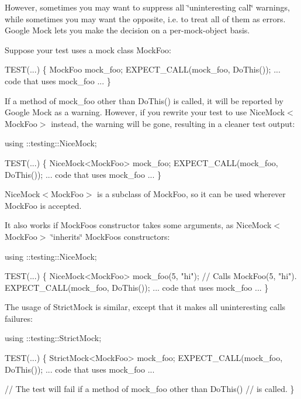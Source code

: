 However, sometimes you may want to suppress all \char`\"{}uninteresting call\char`\"{} warnings, while sometimes you may want the opposite, i.\+e. to treat all of them as errors. Google Mock lets you make the decision on a per-\/mock-\/object basis.

Suppose your test uses a mock class {\ttfamily Mock\+Foo}\+:


\begin{DoxyCode}
TEST(...) \{
  MockFoo mock\_foo;
  EXPECT\_CALL(mock\_foo, DoThis());
  ... code that uses mock\_foo ...
\}
\end{DoxyCode}


If a method of {\ttfamily mock\+\_\+foo} other than {\ttfamily Do\+This()} is called, it will be reported by Google Mock as a warning. However, if you rewrite your test to use {\ttfamily Nice\+Mock$<$Mock\+Foo$>$} instead, the warning will be gone, resulting in a cleaner test output\+:


\begin{DoxyCode}
using ::testing::NiceMock;

TEST(...) \{
  NiceMock<MockFoo> mock\_foo;
  EXPECT\_CALL(mock\_foo, DoThis());
  ... code that uses mock\_foo ...
\}
\end{DoxyCode}


{\ttfamily Nice\+Mock$<$Mock\+Foo$>$} is a subclass of {\ttfamily Mock\+Foo}, so it can be used wherever {\ttfamily Mock\+Foo} is accepted.

It also works if {\ttfamily Mock\+Foo}\textquotesingle{}s constructor takes some arguments, as {\ttfamily Nice\+Mock$<$Mock\+Foo$>$} \char`\"{}inherits\char`\"{} {\ttfamily Mock\+Foo}\textquotesingle{}s constructors\+:


\begin{DoxyCode}
using ::testing::NiceMock;

TEST(...) \{
  NiceMock<MockFoo> mock\_foo(5, \textcolor{stringliteral}{"hi"});  \textcolor{comment}{// Calls MockFoo(5, "hi").}
  EXPECT\_CALL(mock\_foo, DoThis());
  ... code that uses mock\_foo ...
\}
\end{DoxyCode}


The usage of {\ttfamily Strict\+Mock} is similar, except that it makes all uninteresting calls failures\+:


\begin{DoxyCode}
using ::testing::StrictMock;

TEST(...) \{
  StrictMock<MockFoo> mock\_foo;
  EXPECT\_CALL(mock\_foo, DoThis());
  ... code that uses mock\_foo ...

  \textcolor{comment}{// The test will fail if a method of mock\_foo other than DoThis()}
  \textcolor{comment}{// is called.}
\}
\end{DoxyCode}


